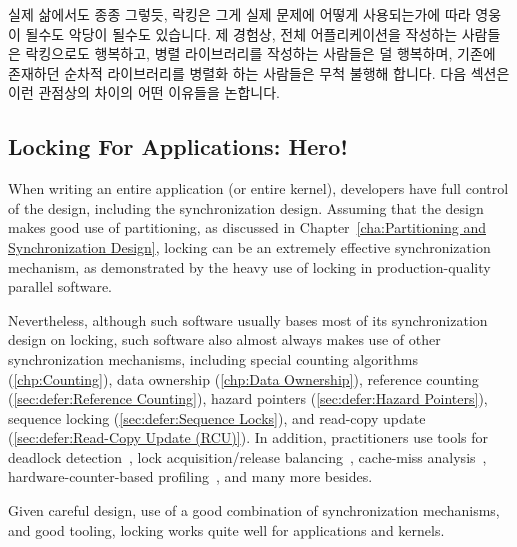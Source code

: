 실제 삶에서도 종종 그렇듯, 락킹은 그게 실제 문제에 어떻게 사용되는가에 따라
영웅이 될수도 악당이 될수도 있습니다.
제 경험상, 전체 어플리케이션을 작성하는 사람들은 락킹으로도 행복하고, 병렬
라이브러리를 작성하는 사람들은 덜 행복하며, 기존에 존재하던 순차적 라이브러리를
병렬화 하는 사람들은 무척 불행해 합니다.
다음 섹션은 이런 관점상의 차이의 어떤 이유들을 논합니다.

\subsection{Locking For Applications: Hero!}
\label{sec:locking:Locking For Applications: Hero!}

When writing an entire application (or entire kernel), developers have
full control of the design, including the synchronization design.
Assuming that the design makes good use of partitioning, as discussed in
Chapter~\ref{cha:Partitioning and Synchronization Design}, locking
can be an extremely effective synchronization mechanism, as demonstrated
by the heavy use of locking in production-quality parallel software.

Nevertheless, although such software usually bases most of its
synchronization design on locking, such software also almost always
makes use of other synchronization mechanisms, including
special counting algorithms (\cref{chp:Counting}),
data ownership (\cref{chp:Data Ownership}),
reference counting (\cref{sec:defer:Reference Counting}),
hazard pointers (\cref{sec:defer:Hazard Pointers}),
sequence locking (\cref{sec:defer:Sequence Locks}), and
read-copy update (\cref{sec:defer:Read-Copy Update (RCU)}).
In addition, practitioners use tools for deadlock
detection~\cite{JonathanCorbet2006lockdep},
lock acquisition/release balancing~\cite{JonathanCorbet2004sparse},
cache-miss analysis~\cite{ValgrindHomePage},
hardware-counter-based profiling~\cite{LinuxKernelPerfWiki,OProfileHomePage},
and many more besides.

Given careful design, use of a good combination of synchronization
mechanisms, and good tooling, locking works quite well for applications
and kernels.

